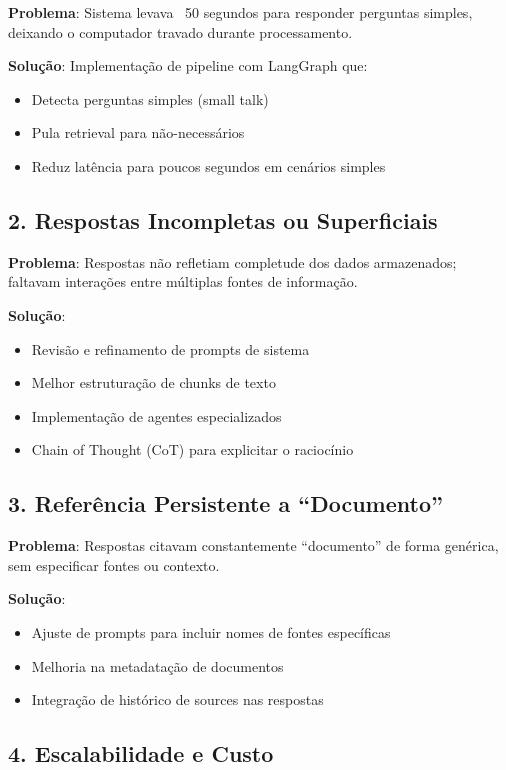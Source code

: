 \documentclass[12pt,a4paper]{report}
\begin{document}
\textbf{Problema}: Sistema levava ~50 segundos para responder perguntas simples, deixando o computador travado durante processamento.

\textbf{Solução}: Implementação de pipeline com LangGraph que:
\begin{itemize}
  \item Detecta perguntas simples (small talk)
  \item Pula retrieval para não-necessários
  \item Reduz latência para poucos segundos em cenários simples
\end{itemize}

\subsection{2. Respostas Incompletas ou Superficiais}

\textbf{Problema}: Respostas não refletiam completude dos dados armazenados; faltavam interações entre múltiplas fontes de informação.

\textbf{Solução}:
\begin{itemize}
  \item Revisão e refinamento de prompts de sistema
  \item Melhor estruturação de chunks de texto
  \item Implementação de agentes especializados
  \item Chain of Thought (CoT) para explicitar o raciocínio
\end{itemize}

\subsection{3. Referência Persistente a ``Documento''} 

\textbf{Problema}: Respostas citavam constantemente ``documento'' de forma genérica, sem especificar fontes ou contexto.

\textbf{Solução}:
\begin{itemize}
  \item Ajuste de prompts para incluir nomes de fontes específicas
  \item Melhoria na metadatação de documentos
  \item Integração de histórico de sources nas respostas
\end{itemize}

\subsection{4. Escalabilidade e Custo}
\end{document}

